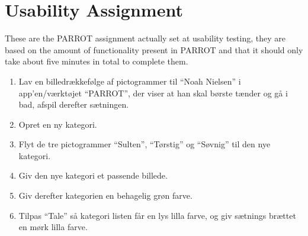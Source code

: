 \section{Usability Assignment}
\label{sec:UseQuest}
These are the PARROT assignment actually set at usability testing, they are based on the amount of functionality present in PARROT and that it should only take about five minutes in total to complete them.

\begin{enumerate}
	\item Lav en billedr\ae{}kkef\o{}lge af pictogrammer til "`Noah Nielsen"' i app'en/v\ae{}rkt\o{}jet "`PARROT"', der viser at han skal b\o{}rste t\ae{}nder og g\aa{} i bad, afspil derefter s\ae{}tningen.
	\item Opret en ny kategori.
	\item Flyt de tre pictogrammer "`Sulten"', "`T\o{}rstig"' og "`S\o{}vnig"' til den nye kategori.
	\item Giv den nye kategori et passende billede.
	\item Giv derefter kategorien en behagelig gr\o{}n farve.
	\item Tilpas "`Tale"' s\aa{} kategori listen f\aa{}r en lys lilla farve, og giv s\ae{}tnings br\ae{}ttet en m\o{}rk lilla farve.
\end{enumerate}